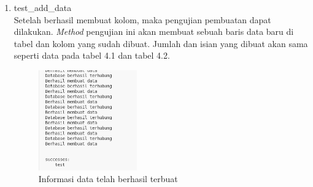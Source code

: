 \begin{enumerate}
	\item test\_add\_data \\
  Setelah berhasil membuat kolom, maka pengujian pembuatan dapat dilakukan. \emph{Method} pengujian ini akan membuat sebuah baris data baru di tabel dan kolom yang sudah dibuat. Jumlah dan 
  isian yang dibuat akan sama seperti data pada tabel 4.1 dan tabel 4.2.
  \begin{figure}[H]
  	\centering{}
	\includegraphics[width=0.4\textwidth]{gambar/bab4/test-create-data}
  	\caption{Informasi data telah berhasil terbuat}
   \end{figure}


\end{enumerate}
